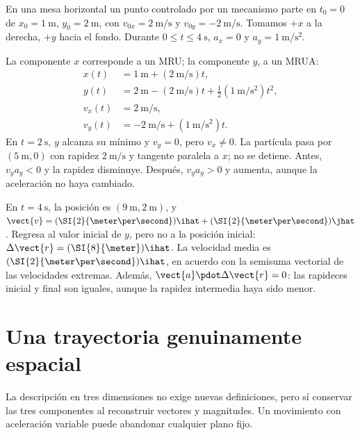 \begin{ejemplo}
En una mesa horizontal un punto controlado por un mecanismo parte en
\(t_0=0\) de \(x_0=\SI{1}{\meter}\), \(y_0=\SI{2}{\meter}\), con
\(v_{0x}=\SI{2}{\meter\per\second}\) y
\(v_{0y}=-\SI{2}{\meter\per\second}\). Tomamos \(+x\) a la derecha,
\(+y\) hacia el fondo. Durante \(0\leq t\leq\SI{4}{\second}\),
\(a_x=0\) y \(a_y=\SI{1}{\meter\per\second\squared}\).

La componente \(x\) corresponde a un MRU; la componente \(y\), a un MRUA:
\[
\begin{aligned}
x(t)&=\SI{1}{\meter}+(\SI{2}{\meter\per\second})t,\\
y(t)&=\SI{2}{\meter}-(\SI{2}{\meter\per\second})t
+\tfrac12(\SI{1}{\meter\per\second\squared})t^2,\\
v_x(t)&=\SI{2}{\meter\per\second},\\
v_y(t)&=-\SI{2}{\meter\per\second}
+(\SI{1}{\meter\per\second\squared})t.
\end{aligned}
\]
En \(t=\SI{2}{\second}\), \(y\) alcanza su mínimo y \(v_y=0\), pero
\(v_x\ne0\). La partícula pasa por \((\SI{5}{\meter},0)\) con rapidez
\(\SI{2}{\meter\per\second}\) y tangente paralela a \(x\); no se detiene.
Antes, \(v_ya_y<0\) y la rapidez disminuye. Después, \(v_ya_y>0\) y
aumenta, aunque la aceleración no haya cambiado.

En \(t=\SI{4}{\second}\), la posición es
\((\SI{9}{\meter},\SI{2}{\meter})\), y
\(\vect{v}=(\SI{2}{\meter\per\second})\ihat
+(\SI{2}{\meter\per\second})\jhat\). Regresa al valor inicial de \(y\),
pero no a la posición inicial: \(\Delta\vect{r}=(\SI{8}{\meter})\ihat\).
La velocidad media es \((\SI{2}{\meter\per\second})\ihat\), en acuerdo
con la semisuma vectorial de las velocidades extremas. Además,
\(\vect{a}\pdot\Delta\vect{r}=0\): las rapideces inicial y final son
iguales, aunque la rapidez intermedia haya sido menor.
\end{ejemplo}

\section{Una trayectoria genuinamente espacial}

La descripción en tres dimensiones no exige nuevas definiciones, pero sí
conservar las tres componentes al reconstruir vectores y magnitudes.
Un movimiento con aceleración variable puede abandonar cualquier plano fijo.

